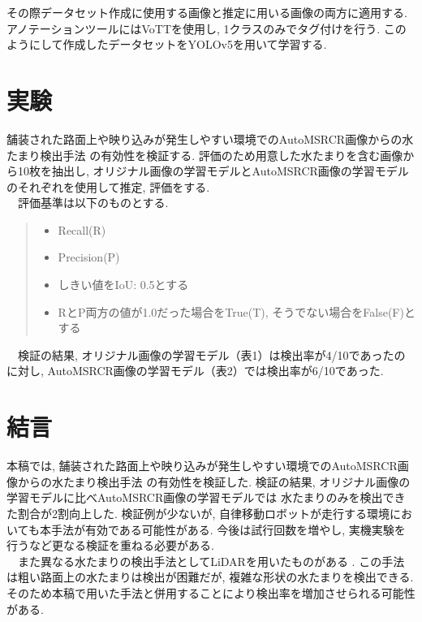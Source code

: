 \documentclass[10pt]{jarticle}
\begin{document}
    その際データセット作成に使用する画像と推定に用いる画像の両方に適用する. 
    アノテーションツールにはVoTTを使用し, 1クラスのみでタグ付けを行う. 
    このようにして作成したデータセットをYOLOv5を用いて学習する. 


    \section{実験}%
    舗装された路面上や映り込みが発生しやすい環境でのAutoMSRCR画像からの水たまり検出手法
    の有効性を検証する. 
    評価のため用意した水たまりを含む画像から10枚を抽出し, 
    オリジナル画像の学習モデルとAutoMSRCR画像の学習モデルのそれぞれを使用して推定, 評価をする. \\
    　評価基準は以下のものとする. 
    \begin{quote}
        \begin{itemize}
         \item Recall(R) 
         \item Precision(P) 
         \item しきい値をIoU: 0.5とする
         \item RとP両方の値が1.0だった場合をTrue(T), 
         そうでない場合をFalse(F)とする
         
        \end{itemize}
       \end{quote}
    　検証の結果, オリジナル画像の学習モデル（表1）は検出率が4/10であったのに対し, 
    AutoMSRCR画像の学習モデル（表2）では検出率が6/10であった. 

    \section{結言}%
    本稿では, 舗装された路面上や映り込みが発生しやすい環境でのAutoMSRCR画像からの水たまり検出手法
    の有効性を検証した. 検証の結果, オリジナル画像の学習モデルに比べAutoMSRCR画像の学習モデルでは
    水たまりのみを検出できた割合が2割向上した. 
    検証例が少ないが, 自律移動ロボットが走行する環境においても本手法が有効である可能性がある. 
    今後は試行回数を増やし, 実機実験を行うなど更なる検証を重ねる必要がある. \\
    　また異なる水たまりの検出手法としてLiDARを用いたものがある\cite{Hirotaka2019} . 
    この手法は粗い路面上の水たまりは検出が困難だが, 複雑な形状の水たまりを検出できる. 
    そのため本稿で用いた手法と併用することにより検出率を増加させられる可能性がある. 
     
\end{document}
